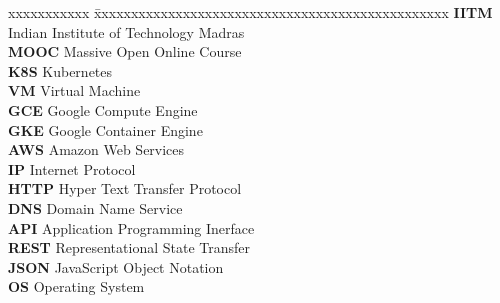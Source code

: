 \documentclass[DD]{iitmdiss}
\begin{document}
\noindent 
\begin{tabbing}
xxxxxxxxxxx \= xxxxxxxxxxxxxxxxxxxxxxxxxxxxxxxxxxxxxxxxxxxxxxxx \kill
\textbf{IITM}   \> Indian Institute of Technology Madras \\
\textbf{MOOC} \> Massive Open Online Course \\
\textbf{K8S} \> Kubernetes \\
\textbf{VM} \> Virtual Machine \\
\textbf{GCE} \> Google Compute Engine \\
\textbf{GKE} \> Google Container Engine \\
\textbf{AWS} \> Amazon Web Services \\
\textbf{IP} \> Internet Protocol \\
\textbf{HTTP} \> Hyper Text Transfer Protocol \\
\textbf{DNS} \> Domain Name Service \\
\textbf{API} \> Application Programming Inerface \\
\textbf{REST} \> Representational State Transfer \\
\textbf{JSON} \> JavaScript Object Notation \\
\textbf{OS} \> Operating System \\
\end{tabbing}

\pagebreak


%
%



\end{document}
